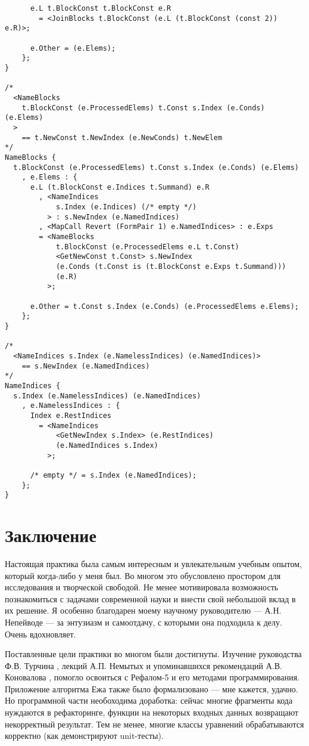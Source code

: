 \documentclass[12pt]{article}
\begin{document}
\begin{verbatim}
      e.L t.BlockConst t.BlockConst e.R
        = <JoinBlocks t.BlockConst (e.L (t.BlockConst (const 2)) e.R)>;

      e.Other = (e.Elems);
    };
}

/*
  <NameBlocks
    t.BlockConst (e.ProcessedElems) t.Const s.Index (e.Conds) (e.Elems)
  >
    == t.NewConst t.NewIndex (e.NewConds) t.NewElem
*/
NameBlocks {
  t.BlockConst (e.ProcessedElems) t.Const s.Index (e.Conds) (e.Elems)
    , e.Elems : {
      e.L (t.BlockConst e.Indices t.Summand) e.R
        , <NameIndices
            s.Index (e.Indices) (/* empty */)
          > : s.NewIndex (e.NamedIndices)
        , <MapCall Revert (FormPair 1) e.NamedIndices> : e.Exps
        = <NameBlocks
            t.BlockConst (e.ProcessedElems e.L t.Const)
            <GetNewConst t.Const> s.NewIndex
            (e.Conds (t.Const is (t.BlockConst e.Exps t.Summand)))
            (e.R)
          >;
          
      e.Other = t.Const s.Index (e.Conds) (e.ProcessedElems e.Elems);
    };
}

/*
  <NameIndices s.Index (e.NamelessIndices) (e.NamedIndices)>
    == s.NewIndex (e.NamedIndices)
*/
NameIndices {
  s.Index (e.NamelessIndices) (e.NamedIndices)
    , e.NamelessIndices : {
      Index e.RestIndices
        = <NameIndices
            <GetNewIndex s.Index> (e.RestIndices)
            (e.NamedIndices s.Index)
          >;

      /* empty */ = s.Index (e.NamedIndices);
    };
}
\end{verbatim}

\section{Заключение}

Настоящая практика была самым интересным и увлекательным учебным опытом,
который когда-либо у меня был. Во многом это обусловлено простором для
исследования и творческой свободой. Не менее мотивировала возможность
познакомиться с задачами современной науки и внести свой небольшой вклад в их
решение. Я особенно благодарен моему научному руководителю --- А.Н. Непейводе
--- за энтузиазм и самоотдачу, с которыми она подходила к делу. Очень
вдохновляет.

Поставленные цели практики во многом были достигнуты. Изучение руководства
Ф.В. Турчина \cite{turchin}, лекций А.П. Немытых \cite{nemytykh} и
упоминавшихся рекомендаций А.В. Коновалова \cite{konovalov-format},
\cite{konovalov-style} помогло освоиться с Рефалом-5 и его методами
программирования. Приложение алгоритма Ежа также было формализовано --- мне
кажется, удачно. Но программной части необоходима доработка: сейчас многие
фрагменты кода нуждаются в рефакторинге, функции на некоторых входных данных
возвращают некорректный результат. Тем не менее, многие классы уравнений
обрабатываются корректно (как демонстрируют unit-тесты).
\end{document}
